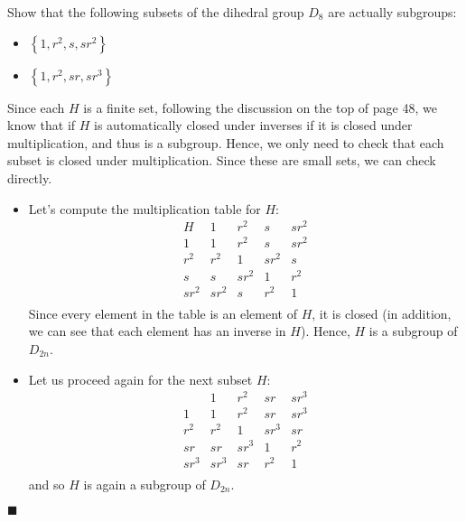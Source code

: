 \documentclass[12pt]{article}
\renewcommand{\qed}{\hfill$\blacksquare$}
\renewenvironment{proof}{\begin{addmargin}[1em]{0em}\begin{newproof}}{\end{newproof}\end{addmargin}\qed}
\newenvironment{problem}[2][Exercise]{\begin{trivlist}
\item[\hskip \labelsep {\bfseries #1}\hskip \labelsep {\bfseries #2.}]}{\end{trivlist}}
\begin{document}
\begin{problem}{2.1.3}
Show that the following subsets of the dihedral group $D_8$ are actually subgroups:
\begin{itemize}
	\item $\left\{1,r^2,s,sr^2\right\}$
	\item $\left\{1,r^2,sr,sr^3\right\}$
\end{itemize}
\end{problem}
\begin{proof}
Since each $H$ is a finite set, following the discussion on the top of page 48, we know that if $H$ is automatically closed under inverses if it is closed under multiplication, and thus is a subgroup. Hence, we only need to check that each subset is closed under multiplication. Since these are small sets, we can check directly.
\begin{itemize}
	\item Let's compute the multiplication table for $H$: $$\begin{array}{c|cccc}
	H & 1 & r^2 & s & sr^2 \\ \hline
	1 & 1 & r^2 & s & sr^2 \\
	r^2 & r^2 & 1 & sr^2 & s \\
	s & s & sr^2 & 1 & r^2 \\
	sr^2 & sr^2 & s & r^2 & 1 \\
	\end{array} $$ Since every element in the table is an element of $H$, it is closed (in addition, we can see that each element has an inverse in $H$). Hence, $H$ is a subgroup of $D_{2n}$.
	\item Let us proceed again for the next subset $H$:
	$$ \begin{array}{c|cccc}
	& 1 & r^2 & sr & sr^3 \\ \hline
	1 & 1& r^2 & sr & sr^3 \\
	r^2 & r^2 & 1 & sr^3 & sr \\
	sr & sr & sr^3 & 1 & r^2 \\
	sr^3 & sr^3 & sr & r^2 & 1 \\
	\end{array}$$ and so $H$ is again a subgroup of $D_{2n}$.
\end{itemize}
\end{proof}
\end{document}
